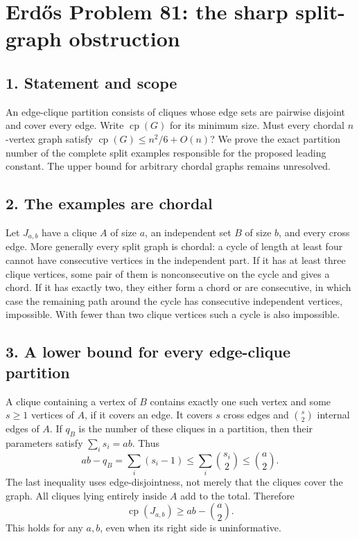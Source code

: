 \section*{Erd\H{o}s Problem 81: the sharp split-graph obstruction}
\subsection*{1. Statement and scope}
An edge-clique partition consists of cliques whose edge sets are pairwise disjoint and cover every edge. Write $\operatorname{cp}(G)$ for its minimum size. Must every chordal $n$-vertex graph satisfy $\operatorname{cp}(G)\le n^2/6+O(n)$? We prove the exact partition number of the complete split examples responsible for the proposed leading constant. The upper bound for arbitrary chordal graphs remains unresolved.

\subsection*{2. The examples are chordal}
Let $J_{a,b}$ have a clique $A$ of size $a$, an independent set $B$ of size $b$, and every cross edge. More generally every split graph is chordal: a cycle of length at least four cannot have consecutive vertices in the independent part. If it has at least three clique vertices, some pair of them is nonconsecutive on the cycle and gives a chord. If it has exactly two, they either form a chord or are consecutive, in which case the remaining path around the cycle has consecutive independent vertices, impossible. With fewer than two clique vertices such a cycle is also impossible.

\subsection*{3. A lower bound for every edge-clique partition}
A clique containing a vertex of $B$ contains exactly one such vertex and some $s\ge1$ vertices of $A$, if it covers an edge. It covers $s$ cross edges and $\binom s2$ internal edges of $A$. If $q_B$ is the number of these cliques in a partition, then their parameters satisfy $\sum_i s_i=ab$. Thus
\[
 ab-q_B=\sum_i(s_i-1)\le\sum_i\binom{s_i}{2}\le\binom a2.
\]
The last inequality uses edge-disjointness, not merely that the cliques cover the graph. All cliques lying entirely inside $A$ add to the total. Therefore
\[
 \operatorname{cp}(J_{a,b})\ge ab-\binom a2. \tag{1}
\]
This holds for any $a,b$, even when its right side is uninformative.

